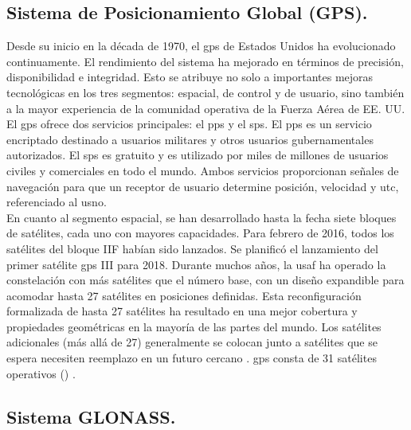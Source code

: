 \subsection*{\fontsize{12}{18}\selectfont Sistema de Posicionamiento Global (GPS).}

\begin{justify}
    Desde su inicio en la década de 1970, el \gls{gps} de Estados Unidos ha evolucionado continuamente. El rendimiento del sistema ha mejorado
    en términos de precisión, disponibilidad e integridad. Esto se atribuye no solo a importantes mejoras tecnológicas en los tres segmentos: espacial, de control y de usuario,
    sino también a la mayor experiencia de la comunidad operativa de la Fuerza Aérea de EE. UU. El \gls{gps} ofrece dos servicios principales: el \gls{pps}
    y el \gls{sps}. El \gls{pps} es un servicio encriptado destinado a usuarios militares y otros usuarios gubernamentales autorizados. El \gls{sps} es gratuito
    y es utilizado por miles de millones de usuarios civiles y comerciales en todo el mundo. Ambos servicios proporcionan señales de navegación para que un receptor de usuario
    determine posición, velocidad y \gls{utc}, referenciado al \gls{usno}.\\
    
    En cuanto al segmento espacial, se han desarrollado hasta la fecha siete bloques de satélites, cada uno con mayores capacidades. Para febrero de 2016, todos los satélites del
    bloque IIF habían sido lanzados. Se planificó el lanzamiento del primer satélite \gls{gps} III para 2018. Durante muchos años, la \gls{usaf} ha operado la
    constelación con más satélites que el número base, con un diseño expandible para acomodar hasta 27 satélites en posiciones definidas. Esta reconfiguración formalizada de
    hasta 27 satélites ha resultado en una mejor cobertura y propiedades geométricas en la mayoría de las partes del mundo. Los satélites adicionales (más allá de 27)
    generalmente se colocan junto a satélites que se espera necesiten reemplazo en un futuro cercano \parencite{kaplan2017understanding}. \gls{gps} consta de 31 satélites operativos
    () \parencite{gpsgov}.
\end{justify}

\subsection*{\fontsize{12}{18}\selectfont Sistema GLONASS.}

